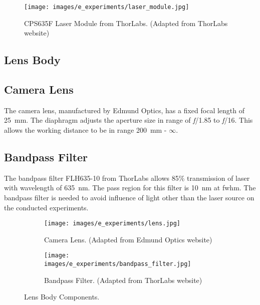     \begin{figure}[ht]
        \centering
        \texttt{[image: images/e\_experiments/laser\_module.jpg]}
        \caption{CPS635F Laser Module from ThorLabs. (Adapted from ThorLabs website\cite{thorlabs_laser})}
        \label{fig:laser_module.jpg}
    \end{figure}

\subsection{Lens Body}
    \subsection*{Camera Lens}
        The camera lens, manufactured by Edmund Optics, has a fixed focal length of \SI{25}{\milli\meter}. The diaphragm adjusts the aperture size in range of \emph{f}/1.85 to \emph{f}/16. This allows the working distance to be in range \SI{200}{\milli\meter} - $\infty$.

    \subsection*{Bandpass Filter}
        The bandpass filter FLH635-10 from ThorLabs allows 85\% transmission of laser with wavelength of \SI{635}{\nano\meter}. The pass region for this filter is \SI{10}{\nano\meter} at \gls{fwhm}. The bandpass filter is needed to avoid influence of light other than the laser source on the conducted experiments.

        \begin{figure}[ht]
            \begin{subfigure}{0.5\textwidth}
                \centering
                \texttt{[image: images/e\_experiments/lens.jpg]}
                \caption{Camera Lens. (Adapted from Edmund Optics website\cite{edmund_optics_lens})}
                \label{fig:lens.jpg}
            \end{subfigure}
            \begin{subfigure}{0.5\textwidth}
                \centering
                \texttt{[image: images/e\_experiments/bandpass\_filter.jpg]}
                \caption{Bandpass Filter. (Adapted from ThorLabs website\cite{thorlabs_bandpass_filter})}
                \label{fig:bandpass_filter.jpg}
            \end{subfigure}
            \caption{Lens Body Components.}
            \label{fig:lens_body.jpg}
        \end{figure}

